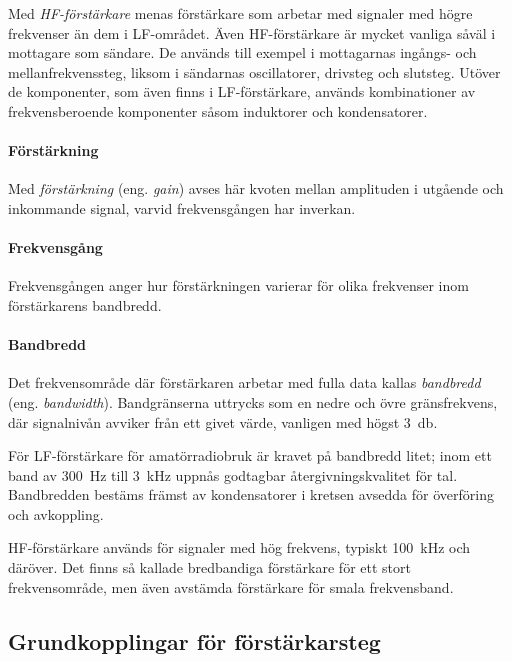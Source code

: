 Med \emph{HF-förstärkare} menas förstärkare som arbetar med signaler
med högre frekvenser än dem i LF-området.
Även HF-förstärkare är mycket vanliga såväl i mottagare som sändare.
De används till exempel i mottagarnas ingångs- och mellanfrekvenssteg, liksom i
sändarnas oscillatorer, drivsteg och slutsteg.
Utöver de komponenter, som även finns i LF-förstärkare, används kombinationer
av frekvensberoende komponenter såsom induktorer och kondensatorer.

\paragraph{Förstärkning}

Med \emph{förstärkning} (eng. \emph{gain}) avses här kvoten mellan amplituden i
utgående och inkommande signal, varvid frekvensgången har inverkan.

\paragraph{Frekvensgång}
Frekvensgången anger hur förstärkningen varierar för olika frekvenser inom förstärkarens bandbredd.

\paragraph{Bandbredd}

Det frekvensområde där förstärkaren arbetar med fulla data kallas
\emph{bandbredd} (eng. \emph{bandwidth}).
Bandgränserna uttrycks som en nedre och övre gränsfrekvens, där signalnivån
avviker från ett givet värde, vanligen med högst \SI{3}{\decibel}.

För LF-förstärkare för amatörradiobruk är kravet på bandbredd litet; inom ett
band av 300~Hz till 3~kHz uppnås godtagbar återgivningskvalitet för tal.
Bandbredden bestäms främst av kondensatorer i kretsen avsedda för överföring
och avkoppling.

HF-förstärkare används för signaler med hög frekvens, typiskt 100~kHz och
däröver.
Det finns så kallade bredbandiga förstärkare för ett stort frekvensområde, men
även avstämda förstärkare för smala frekvensband.

\subsection{Grundkopplingar för förstärkarsteg}

